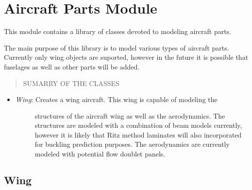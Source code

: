 \documentclass[letterpaper,10pt,english]{sphinxmanual}
\begin{document}
\section{Aircraft Parts Module}
\label{AircraftParts:aircraft-parts-module}\label{AircraftParts::doc}\label{AircraftParts:module-AeroComBAT.AircraftParts}
This module contains a library of classes devoted to modeling aircraft parts.

The main purpose of this library is to model various types of aircraft parts.
Currently only wing objects are suported, however in the future it is possible
that fuselages as well as other parts will be added.
\begin{quote}\begin{description}
\item[{SUMARRY OF THE CLASSES}] \leavevmode
\end{description}\end{quote}
\begin{itemize}
\item {} \begin{description}
\item[{\emph{Wing}: Creates a wing aircraft. This wing is capable of modeling the}] \leavevmode
structures of the aircraft wing as well as the aerodynamics. The structures
are modeled with a combination of beam models currently, however it is
likely that Ritz method laminates will also incorporated for buckling
prediction purposes. The aerodynamics are currently modeled with potential
flow doublet panels.

\end{description}

\end{itemize}


\subsection{Wing}
\label{AircraftParts:wing}
\end{document}
